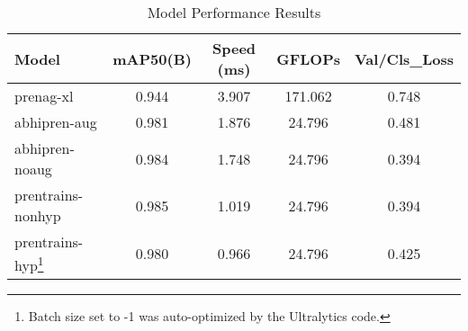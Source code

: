 \documentclass[11pt]{IEEEtran}
\begin{document}
\begin{table*}[t]
    \centering
    \caption{Comprehensive Results: Epochs, Loss, Model Parameters, Speed,
        GFLOPs, and mAP Across All Models}
    \label{table:comprehensive_results}
\end{table*}

\begin{table}[h!]
    \centering
    \caption{Model Performance Results}
    \label{table:performance_results}
    \begin{tabular}{lcccc}
        \toprule
        Model              & mAP50(B) & Speed (ms) & GFLOPs  & Val/Cls\_Loss \\
        \midrule
        prenag-xl          & 0.944    & 3.907      & 171.062 & 0.748         \\
        abhipren-aug       & 0.981    & 1.876      & 24.796  & 0.481         \\
        abhipren-noaug     & 0.984    & 1.748      & 24.796  & 0.394         \\
        prentrains-nonhyp  & 0.985    & 1.019      & 24.796  & 0.394         \\
        prentrains-hyp\footnote{Batch size set to -1 was auto-optimized by the
        Ultralytics code.} & 0.980    & 0.966      & 24.796  & 0.425         \\
        \bottomrule
    \end{tabular}
\end{table}
\end{document}
